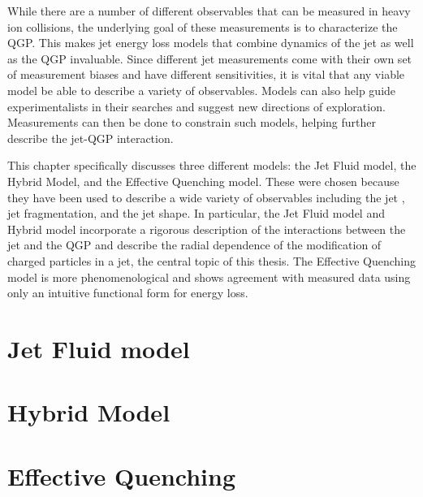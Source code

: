 
While there are a number of different observables that can be measured in heavy ion collisions, the underlying goal of these measurements is to characterize the QGP.
This makes jet energy loss models that combine dynamics of the jet as well as the QGP invaluable.
Since different jet measurements come with their own set of measurement biases and have different sensitivities, it is vital that any viable model be able to describe a variety of observables.
Models can also help guide experimentalists in their searches and suggest new directions of exploration.
Measurements can then be done to constrain such models, helping further describe the jet-QGP interaction.


%
This chapter specifically discusses three different models: the Jet Fluid model, the Hybrid Model, and the Effective Quenching model.
These were chosen because they have been used to describe a wide variety of observables including the jet \RAA, jet fragmentation, and the jet shape.
In particular, the Jet Fluid model and Hybrid model incorporate a rigorous description of the interactions between the jet and the QGP and describe the radial dependence of the modification of charged particles in a jet, the central topic of this thesis. 
The Effective Quenching model is more phenomenological and shows agreement with measured data using only an intuitive functional form for energy loss.

\section{Jet Fluid model}

\label{sec:jet_fluid}

\section{Hybrid Model}

\label{sec:hybrid_model}

\section{Effective Quenching}

\label{sec:eff_quench}


